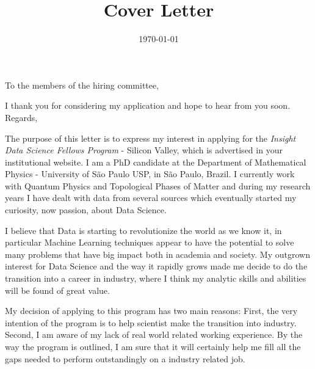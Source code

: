 \documentclass[11pt,a4paper,roman]{moderncv}        %
\title{Cover Letter}                               %
\begin{document}
\date{\today}
\opening{To the members of the hiring committee,}
\closing{I thank you for considering my application and hope to hear from you soon.\\ Regards,}
\makelettertitle

The purpose of this letter is to express my interest in applying for the \textit{Insight Data Science Fellows Program} - Silicon Valley, which is advertised in your institutional website. I am a PhD candidate at the Department of Mathematical Physics - University of São Paulo USP, in São Paulo, Brazil. I currently work with Quantum Physics and Topological Phases of Matter and during my research years I have dealt with data from several sources which eventually started my curiosity, now passion, about Data Science. 

I believe that Data is starting to revolutionize the world as we know it, in particular Machine Learning techniques appear to have the potential to solve many problems that have big impact both in academia and society. My outgrown interest for Data Science and the way it rapidly grows made me decide to do the transition into a career in industry, where I think my analytic skills and abilities will be found of great value.

My decision of applying to this program has two main reasons: First, the very intention of the program is to help scientist make the transition into industry. Second, I am aware of my lack of real world related working experience. By the way the program is outlined, I am sure that it will certainly help me fill all the gaps needed to perform outstandingly on a industry related job. 


\vspace{0.5cm}


\makeletterclosing
\end{document}
